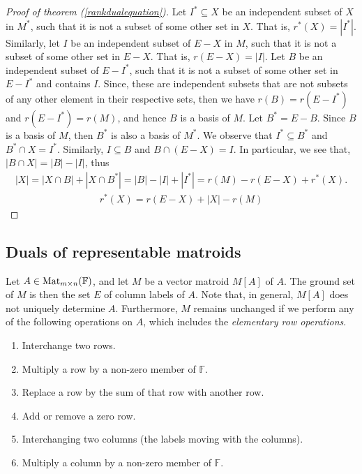 \begin{proof}[Proof of theorem (\ref{rankdualequation})]
    Let $I^* \subseteq X$ be an independent subset of $X$ in $M^*$, such that it is not a subset of some other set in $X$. That is, $r^*(X)=|I^*|$. Similarly, let $I$ be an independent subset of $E-X$ in $M$, such that it is not a subset of some other set in $E-X$. That is, $r(E-X)=|I|$. Let $B$ be an independent subset of $E-I^*$, such that it is not a subset of some other set in $E-I^*$ and contains $I$. Since, these are independent subsets that are not subsets of any other element in their respective sets, then we have $r(B)=r(E-I^*)$ and $r(E-I^*)=r(M)$, and hence $B$ is a basis of $M$.
    Let $B^*=E-B$. Since $B$ is a basis of $M$, then $B ^* $ is also a basis of $M^*$. We observe that $I^*\subseteq B^*$ and  $B^*\cap X=I^*$. Similarly, $I\subseteq B$ and  $B\cap (E-X)=I$. In particular, we see that, $|B\cap X|=|B|-|I|$, thus
    \begin{align*}
    |X|=|X\cap B|+|X\cap B^*|=|B|-|I|+|I^*|=r(M)-r(E-X)+r^*(X).
    \end{align*}
    \begin{align*}
    r^*(X)=r(E-X)+|X|-r(M)
    \end{align*}
\end{proof}

\newpage
\subsection{Duals of representable matroids}

Let $A\in \operatorname{Mat}_{m\times n}(\mathbb{F})$, and let $M$ be a vector matroid $M[A]$ of $A$. The ground set of $M$ is then the set $E$ of column labels of $A$. Note that, in general, $M[A]$ does not uniquely determine $A$. Furthermore, $M$ remains unchanged if we perform any of the following operations on $A$, which includes the \textit{elementary row operations}.
\begin{enumerate}
    \item Interchange two rows.
    \item Multiply a row by a non-zero member of $\mathbb{F}$.
    \item Replace a row by the sum of that row with another row.
    \item Add or remove a zero row.
    \item Interchanging two columns (the labels moving with the columns).
    \item Multiply a column by a non-zero member of $\mathbb{F}$.
\end{enumerate}

